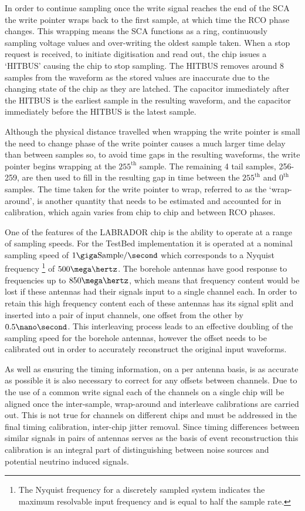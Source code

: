 In order to continue sampling once the write signal reaches the end of the SCA the write pointer wraps back to the first sample, at which time the RCO phase changes. This wrapping means the SCA functions as a ring, continuously sampling voltage values and over-writing the oldest sample taken. When a stop request is received, to initiate digitisation and read out, the chip issues a `HITBUS' causing the chip to stop sampling. The HITBUS removes around 8 samples from the waveform as the stored values are inaccurate due to the changing state of the chip as they are latched. The capacitor immediately after the HITBUS is the earliest sample in the resulting waveform, and the capacitor immediately before the HITBUS is the latest sample. 

Although the physical distance travelled when wrapping the write pointer is small the need to change phase of the write pointer causes a much larger time delay than between samples so, to avoid time gaps in the resulting waveforms, the write pointer begins wrapping at the $255^{\mbox{th}}$ sample. The remaining 4 tail samples, 256-259, are then used to fill in the resulting gap in time between the $255^{\mbox{th}}$ and $0^{\mbox{th}}$ samples.  The time taken for the write pointer to wrap, referred to as the `wrap-around', is another quantity that needs to be estimated and accounted for in calibration, which again varies from chip to chip and between RCO phases.


One of the features of the LABRADOR chip is the ability to operate at a range of sampling speeds. For the TestBed implementation it is operated at a nominal sampling speed of $1 \giga \mbox{Sample} /\second$ which corresponds to a Nyquist frequency \footnote{The Nyquist frequency for a discretely sampled system indicates the maximum resolvable input frequency and is equal to half the sample rate.} of $500 \mega \hertz$. The borehole antennas have good response to frequencies up to $850 \mega \hertz$, which means that frequency content would be lost if these antennas had their signals input to a single channel each. In order to retain this high frequency content each of these antennas has its signal split and inserted into a pair of input channels, one offset from the other by $0.5 \nano \second$. This interleaving process leads to an effective doubling of the sampling speed for the borehole antennas, however the offset needs to be calibrated out in order to accurately reconstruct the original input waveforms. 

As well as ensuring the timing information, on a per antenna basis, is as accurate as possible it is also necessary to correct for any offsets between channels. Due to the use of a common write signal each of the channels on a single chip will be aligned once the inter-sample, wrap-around and interleave calibrations are carried out. This is not true for channels on different chips and must be addressed in the final timing calibration, inter-chip jitter removal. Since timing differences between similar signals in pairs of antennas serves as the basis of event reconstruction this calibration is an integral part of distinguishing between noise sources and potential neutrino induced signals. 

